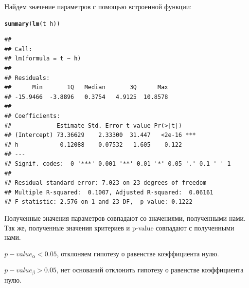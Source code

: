 \documentclass{article}\usepackage[]{graphicx}\usepackage[]{color}
\makeatletter
\newcommand{\hlopt}[1]{\textcolor[rgb]{0,0,0}{#1}}%
\newcommand{\hlstd}[1]{\textcolor[rgb]{0.345,0.345,0.345}{#1}}%
\newcommand{\hlkwd}[1]{\textcolor[rgb]{0.737,0.353,0.396}{\textbf{#1}}}%
\newenvironment{kframe}{%
 \def\at@end@of@kframe{}%
 \ifinner\ifhmode%
  \def\at@end@of@kframe{\end{minipage}}%
  \begin{minipage}{\columnwidth}%
 \fi\fi%
 \def\FrameCommand##1{\hskip\@totalleftmargin \hskip-\fboxsep
 \colorbox{shadecolor}{##1}\hskip-\fboxsep
     \hskip-\linewidth \hskip-\@totalleftmargin \hskip\columnwidth}%
 \MakeFramed {\advance\hsize-\width
   \@totalleftmargin\z@ \linewidth\hsize
   \@setminipage}}%
 {\par\unskip\endMakeFramed%
 \at@end@of@kframe}
\newenvironment{knitrout}{}{} %
\makeatother
\begin{document}
\newpage
Найдем значение параметров с помощью встроенной функции:
\begin{knitrout}
\color{fgcolor}\begin{kframe}
\begin{alltt}
\hlkwd{summary}\hlstd{(}\hlkwd{lm}\hlstd{(t}\hlopt{~}\hlstd{h))}
\end{alltt}
\begin{verbatim}
## 
## Call:
## lm(formula = t ~ h)
## 
## Residuals:
##      Min       1Q   Median       3Q      Max 
## -15.9466  -3.8896   0.3754   4.9125  10.8578 
## 
## Coefficients:
##             Estimate Std. Error t value Pr(>|t|)    
## (Intercept) 73.36629    2.33300  31.447   <2e-16 ***
## h            0.12088    0.07532   1.605    0.122    
## ---
## Signif. codes:  0 '***' 0.001 '**' 0.01 '*' 0.05 '.' 0.1 ' ' 1
## 
## Residual standard error: 7.023 on 23 degrees of freedom
## Multiple R-squared:  0.1007,	Adjusted R-squared:  0.06161 
## F-statistic: 2.576 on 1 and 23 DF,  p-value: 0.1222
\end{verbatim}
\end{kframe}
\end{knitrout}
Полученные значения параметров совпадают со значениями, полученными нами. Так же, полученные значения критериев и p-value совпадают с полученными нами.

\newline

$p-value_{\alpha} < 0.05$, отклоняем гипотезу о равенстве коэффициента нулю.

$p-value_{\beta} > 0.05$, нет оснований отклонить гипотезу о равенстве коэффициента нулю.

\newline
\end{document}
